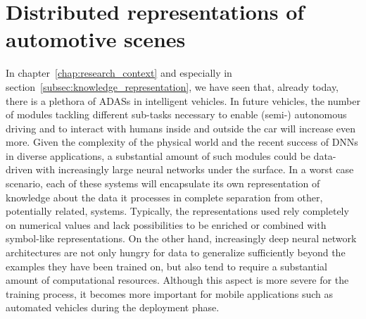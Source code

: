 \chapter{Distributed representations of automotive scenes}%
\label{chap:a_cognitive_approach_to_represent_automotive_scenes}

In chapter~\ref{chap:research_context} and especially in section~\ref{subsec:knowledge_representation}, we have seen that, already today, there is a plethora of \acfp{ADAS} in intelligent vehicles. 
In future vehicles, the number of modules tackling different sub-tasks necessary to enable (semi-) autonomous driving and to interact with humans inside and outside the car will increase even more.
Given the complexity of the physical world and the recent success of \acp{DNN} in diverse applications, a substantial amount of such modules could be data-driven with increasingly large neural networks under the surface.
In a worst case scenario, each of these systems will encapsulate its own representation of knowledge about the data it processes in complete separation from other, potentially related, systems.
Typically, the representations used rely completely on numerical values and lack possibilities to be enriched or combined with symbol-like representations.
On the other hand, increasingly deep neural network architectures are not only hungry for data to generalize sufficiently beyond the examples they have been trained on, but also tend to require a substantial amount of computational resources.
Although this aspect is more severe for the training process, it becomes more important for mobile applications such as automated vehicles during the deployment phase.

